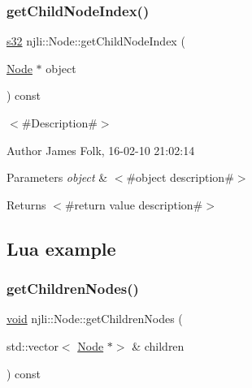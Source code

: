 \subsubsection{\texorpdfstring{get\+Child\+Node\+Index()}{getChildNodeIndex()}}
{\footnotesize\ttfamily \mbox{\hyperlink{_util_8h_aa62c75d314a0d1f37f79c4b73b2292e2}{s32}} njli\+::\+Node\+::get\+Child\+Node\+Index (\begin{DoxyParamCaption}\item[{\mbox{\hyperlink{classnjli_1_1_node}{Node}} $\ast$}]{object }\end{DoxyParamCaption}) const}



$<$\#\+Description\#$>$ 

\begin{DoxyAuthor}{Author}
James Folk, 16-\/02-\/10 21\+:02\+:14
\end{DoxyAuthor}

\begin{DoxyParams}{Parameters}
{\em object} & $<$\#object description\#$>$\\
\hline
\end{DoxyParams}
\begin{DoxyReturn}{Returns}
$<$\#return value description\#$>$
\end{DoxyReturn}
\hypertarget{classnjli_1_1_steering_behavior_wander_ex1}{}\subsection{Lua example}\label{classnjli_1_1_steering_behavior_wander_ex1}

\begin{DoxyCodeInclude}
\end{DoxyCodeInclude}
\mbox{\label{classnjli_1_1_node_a941c51cab768f4f3faf80bcb590602e2}} 
\subsubsection{\texorpdfstring{get\+Children\+Nodes()}{getChildrenNodes()}}
{\footnotesize\ttfamily \mbox{\hyperlink{_thread_8h_af1e856da2e658414cb2456cb6f7ebc66}{void}} njli\+::\+Node\+::get\+Children\+Nodes (\begin{DoxyParamCaption}\item[{std\+::vector$<$ \mbox{\hyperlink{classnjli_1_1_node}{Node}} $\ast$$>$ \&}]{children }\end{DoxyParamCaption}) const}



